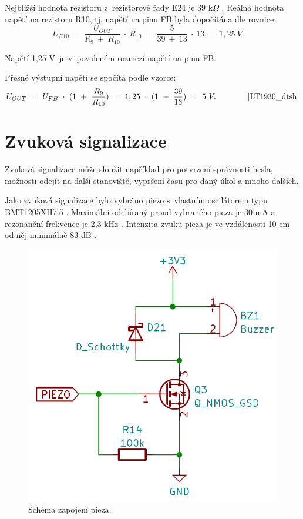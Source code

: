 Nejbližší hodnota rezistoru z~rezistorové řady E24 je 39 k$\Omega$ \cite{rezistorova_rada}. Reálná hodnota napětí na rezistoru R10, tj. napětí na pinu FB byla dopočítána
dle rovnice:
\begin{equation} 
  U_{R10}~=~\frac{U_{OUT}}{R_{9}~+~R_{10}}~\cdot~R_{10}~=~\frac{5}{39~+~13}~\cdot~13~=~1,25~V. 
  \quad
\label{eq:UR10}
\end{equation}

Napětí 1,25 V~je v~povoleném rozmezí napětí na pinu FB. 

Přesné výstupní napětí se spočítá podle vzorce:
\begin{equation} 
  U_{OUT}~=~U_{FB}~\cdot~(1~+~\frac{R_{9}}{R_{10}})~=~1,25~\cdot~(1~+~\frac{39}{13})~=~5~V. 
  \quad \quad \quad \quad \cite{LT1930_dtsh}
\label{eq:VOUT_LT1930}
\end{equation}

\section{Zvuková signalizace}
Zvuková signalizace může sloužit například pro potvrzení správnosti hesla, možnosti odejít na další stanoviště, vypršení času pro daný úkol a mnoho dalších. 

Jako zvuková signalizace bylo vybráno piezo s~vlastním oscilátorem typu \\BMT1205XH7.5 \cite{piezo_dtsh}. Maximální odebíraný proud vybraného pieza je 30 mA a rezonanční frekvence 
je 2,3 kHz \cite{piezo_dtsh}. Intenzita zvuku pieza je ve vzdálenosti 10 cm od něj minimálně 83 dB \cite{piezo_dtsh}.

\begin{figure}[!h]
  \begin{center}
    \includegraphics[scale=0.45]{obrazky/piezo.png}
  \end{center}
  \caption[Schéma zapojení pieza]{Schéma zapojení pieza.}
\end{figure}

